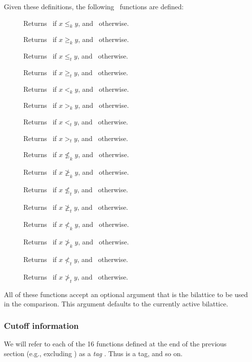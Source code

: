 Given these definitions, the following \lisp\ functions are defined:
 \begin{description}
 \item [] Returns \T\ if $x \leq_k y$, and \NIL\ otherwise.
 \item [] Returns \T\ if $x \geq_k y$, and \NIL\ otherwise.
 \item [] Returns \T\ if $x \leq_t y$, and \NIL\ otherwise.
 \item [] Returns \T\ if $x \geq_t y$, and \NIL\ otherwise.
 \item [] Returns \T\ if $x <_k y$, and \NIL\ otherwise.
 \item [] Returns \T\ if $x >_k y$, and \NIL\ otherwise.
 \item [] Returns \T\ if $x <_t y$, and \NIL\ otherwise.
 \item [] Returns \T\ if $x >_t y$, and \NIL\ otherwise.
 \item [] Returns \T\ if $x \not\leq_k y$, and
\NIL\ otherwise.
 \item [] Returns \T\ if $x \not\geq_k y$, and
\NIL\ otherwise.
 \item [] Returns \T\ if $x \not\leq_t y$, and
\NIL\ otherwise.
 \item [] Returns \T\ if $x \not\geq_t y$, and
\NIL\ otherwise.
 \item [] Returns \T\ if $x \not<_k y$, and \NIL\
otherwise.
 \item [] Returns \T\ if $x \not>_k y$, and \NIL\
otherwise.
 \item [\itype{t-not-lt(x y)}] Returns \T\ if $x \not<_t y$, and \NIL\
otherwise.
 \item [] Returns \T\ if $x \not>_t y$, and \NIL\
otherwise.
 \end{description}

All of these functions accept an optional argument that is the
bilattice to be used in the comparison.  This argument defaults to
the currently active bilattice.

\subsubsection{Cutoff information}
\label{s.cutoffs}

We will refer to each of the 16 functions defined at the end of the
previous section (e.g., excluding ) as a {\em tag}
\index{tag}.  Thus  is a tag, and so on.

